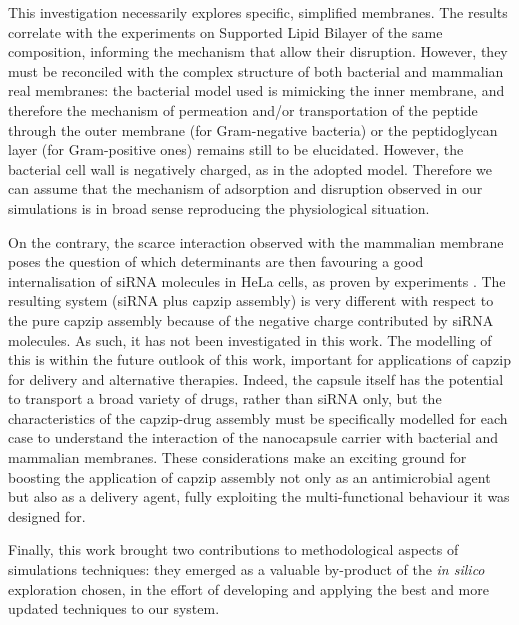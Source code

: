 This investigation necessarily explores specific, simplified membranes. The results correlate with the experiments on Supported Lipid Bilayer of the same composition, informing the mechanism that allow their disruption. However, they must be reconciled with the complex structure of both bacterial and mammalian real membranes: the bacterial model used is mimicking the inner membrane, and therefore the mechanism of permeation and/or transportation of the peptide through the outer membrane (for Gram-negative bacteria) or the peptidoglycan layer (for Gram-positive ones) remains still to be elucidated.
%
However, the bacterial cell wall is negatively charged, as in the adopted model. Therefore we can assume that the mechanism of adsorption and disruption observed in our simulations is in broad sense reproducing the physiological situation.
%

On the contrary, the scarce interaction observed with the mammalian membrane poses the question of which determinants are then favouring a good internalisation of siRNA molecules in HeLa cells, as proven by experiments \cite{Castelletto2016}. The resulting system (siRNA plus capzip assembly) is very different with respect to the pure capzip assembly because of the negative charge contributed by siRNA molecules. As such, it has not been investigated in this work. The modelling of this is within the future outlook of this work, important for applications of capzip for delivery and alternative therapies.
%
Indeed, the capsule itself has the potential to transport a broad variety of drugs, rather than siRNA only, but the characteristics of the capzip-drug assembly must be specifically modelled for each case to understand the interaction of the nanocapsule carrier with bacterial and mammalian membranes.
%
These considerations make an exciting ground for boosting the application of capzip assembly not only as an antimicrobial agent but also as a delivery agent, fully exploiting the multi-functional behaviour it was designed for.

Finally, this work brought two contributions to methodological aspects of simulations techniques: they emerged as a valuable by-product of the \emph{in silico} exploration chosen, in the effort of developing and applying the best and more updated techniques to our system.

